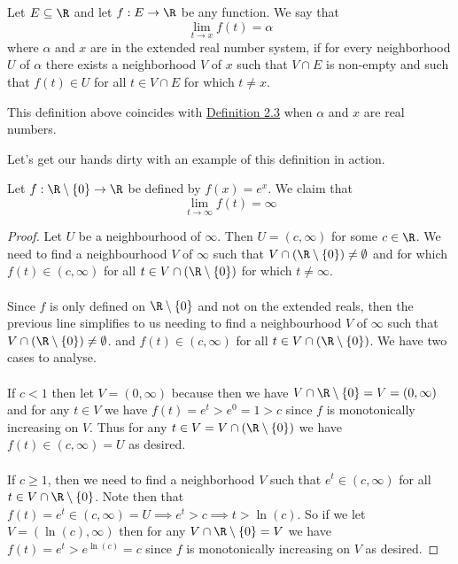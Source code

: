 	 
	 \begin{definition}
	 	Let $E \subseteq \R$ and let $f : E \to \R$ be any function. We say that $$\lim_{t \to x}f(t) = \alpha$$ where $\alpha$ and $x$ are in the extended real number system, if for every neighborhood $U$ of $\alpha$ there exists a neighborhood $V$ of $x$ such that $V \cap E$ is non-empty and such that $f(t) \in U$ for all $t \in V \cap E$ for which $t \neq x$.
	 \end{definition}
	 
	 
	 \begin{remark}
	 	This definition above coincides with \hyperlink{limit-function-defn}{Definition 2.3} when $\alpha$ and $x$ are real numbers.
	 \end{remark}
	 
	 Let's get our hands dirty with an example of this definition in action.
	 
	 \begin{example}
	 	Let $f : \R \setminus \{0\} \to \R$ be defined by $f(x) = e^x$. We claim that $$\lim_{t \to \infty} f(t) = \infty$$
	 \end{example}
	 
	 \begin{proof}
	 	Let $U$ be a neighbourhood of $\infty$. Then $U = (c, \infty)$ for some $c \in \R$. We need to find a neighbourhood $V$ of $\infty$ such that $V \cap\left(  \R \setminus \{0\}\right) \neq \emptyset $ and for which $f(t) \in (c, \infty)$ for all $t \in V \cap\left(  \R \setminus \{0\}\right) $ for which $t \neq \infty$. \\ \\
	 	Since $f$ is only defined on $\R \setminus \{0\}$ and not on the extended reals, then the  previous line simplifies to us needing to find a neighbourhood $V$ of $\infty$ such that $V \cap\left(  \R \setminus \{0\}\right) \neq \emptyset $. and $f(t) \in (c, \infty)$ for all $t \in V \cap\left(  \R \setminus \{0\}\right) $.  We have two cases to analyse.\\ \\
	 	If $c < 1$ then let $V = (0, \infty)$ because then we have $V \cap \R \setminus \{0\} = V = (0, \infty)$ and for any $t \in V$ we have $f(t) = e^t > e^0 = 1 > c$ since $f$ is monotonically increasing on $V$. Thus for any $t \in V = V \cap\left(  \R \setminus \{0\}\right)$ we have $f(t) \in (c, \infty) = U$ as desired. \\ \\
	 	If $ c \geq 1$, then we need to find a neighborhood $V$ such that $e^t \in (c, \infty)$ for all $t \in V \cap \R \setminus \{0\}$. Note then that $f(t) = e^t \in (c, \infty) = U \implies e^t > c \implies t > \ln(c)$. So if we let $V = (\ln(c), \infty)$ then for any $V \cap \R \setminus \{0\} = V$ we have $f(t) = e^t > e^{\ln(c)} = c$ since $f$ is monotonically increasing on $V$ as desired.
	 \end{proof}
	 
